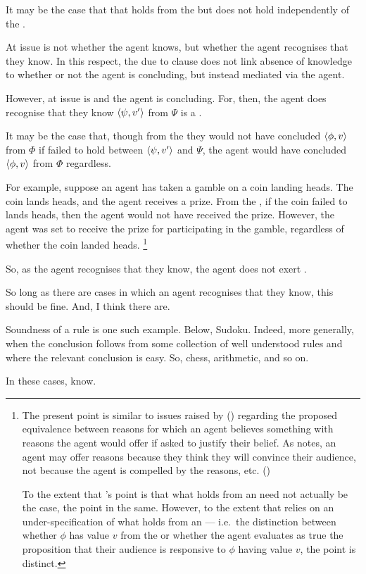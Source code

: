 \begin{note}
  It may be the case that that  holds from the \agpe{} but does not hold independently of the \agpe{}.

  At issue is not whether the agent knows, but whether the agent recognises that they know.
  In this respect, the due to clause does not link absence of knowledge to whether or not the agent is concluding, but instead mediated via the agent.

  However, at issue is \requ{} and the agent is concluding.
  For, then, the agent does recognise that they know \(\langle \psi, v' \rangle\) from \(\Psi\) is a \fc{}.

  It may be the case that, though from the \agpe{} they would not have concluded \(\langle \phi, v \rangle\) from \(\Phi\) if \ros{} failed to hold between \(\langle \psi, v' \rangle\) and \(\Psi\), the agent would have concluded \(\langle \phi, v \rangle\) from \(\Phi\) regardless.

  For example, suppose an agent has taken a gamble on a coin landing heads.
  The coin lands heads, and the agent receives a prize.
  From the \agpe{}, if the coin failed to lands heads, then the agent would not have received the prize.
  However, the agent was set to receive the prize for participating in the gamble, regardless of whether the coin landed heads.%
  \footnote{
    The present point is similar to issues raised by \citeauthor{Harman:1973ww} (\citeyear{Harman:1973ww}) regarding the proposed equivalence between reasons for which an agent believes something with reasons the agent would offer if asked to justify their belief.
  As \citeauthor{Harman:1973ww} notes, an agent may offer reasons because they think they will convince their audience, not because the agent is compelled by the reasons, etc.
  (\citeyear[Ch.2]{Harman:1973ww})

  To the extent that \citeauthor{Harman:1973ww}'s point is that what holds from an \agpe{} need not actually be the case, the point in the same.
  However, to the extent that \citeauthor{Harman:1973ww} relies on an under-specification of what holds from an \agpe{} --- i.e.\ the distinction between whether \(\phi\) has value \(v\) from the \agpe{} or whether the agent evaluates as true the proposition that their audience is responsive to \(\phi\) having value \(v\), the point is distinct.
  }
\end{note}

\begin{note}
  So, as the agent recognises that they know, the agent does not exert \ninf{}.

  So long as there are cases in which an agent recognises that they know, this should be fine.
  And, I think there are.

  Soundness of a rule is one such example.
  Below, Sudoku.
  Indeed, more generally, when the conclusion follows from some collection of well understood rules and where the relevant conclusion is easy.
  So, chess, arithmetic, and so on.

  In these cases, know.
\end{note}

